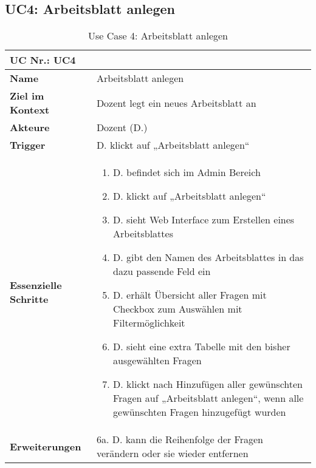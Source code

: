\begin{table}[h]
\subsection{UC4: Arbeitsblatt anlegen}\label{uc:UC4}
	\begin{tabular}{|p{3cm}|p{11.06cm}|}
	\hline
		\multicolumn{2}{|l|}{\textbf{UC Nr.: UC4} }   \\ \hline
		\textbf{Name}                 &     Arbeitsblatt anlegen    \\ \hline
		\textbf{Ziel im Kontext}      &     Dozent legt ein neues Arbeitsblatt an    \\ \hline
		\textbf{Akteure}              &     Dozent (D.)    \\ \hline
		\textbf{Trigger}              &     D. klickt auf „Arbeitsblatt anlegen“    \\ \hline
		\textbf{Essenzielle Schritte} & 
			\begin{enumerate}
			  \item D. befindet sich im Admin Bereich
			  \item D. klickt auf „Arbeitsblatt anlegen“
			  \item D. sieht Web Interface zum Erstellen eines Arbeitsblattes
			  \item D. gibt den Namen des Arbeitsblattes in das dazu passende Feld ein
			  \item D. erhält Übersicht aller Fragen mit Checkbox zum Auswählen mit Filtermöglichkeit
			  \item D. sieht eine extra Tabelle mit den bisher ausgewählten Fragen
			  \item D. klickt nach Hinzufügen aller gewünschten Fragen auf „Arbeitsblatt anlegen“, wenn alle gewünschten Fragen hinzugefügt wurden
			\end{enumerate}
		\\ \hline
		\textbf{Erweiterungen} 		  &   6a. D. kann die Reihenfolge der Fragen verändern oder sie wieder entfernen      \\ \hline
	\end{tabular}
	\caption{Use Case 4: Arbeitsblatt anlegen}
\end{table}\FloatBarrier




